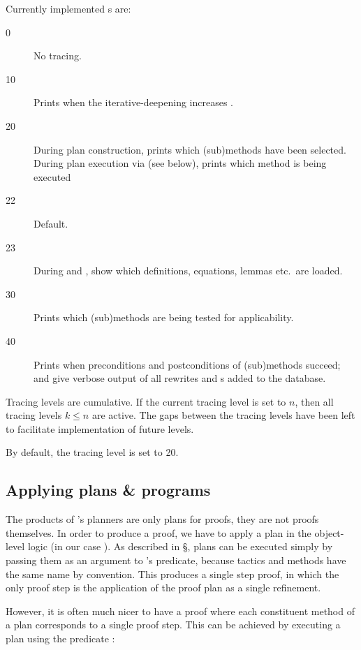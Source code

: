 Currently implemented s are:
\begin{description}
\item[0\ ] No tracing.
\item[10] Prints when the iterative-deepening increases .
\item[20] During plan construction, prints which (sub)methods have been
         selected. During plan execution via  (see
         below), prints which method is being executed
\item [22] Default.
\item [23] During  and , show which definitions,
equations, lemmas etc.\ are loaded.
\item[30] Prints which (sub)methods are being tested for applicability.
\item[40] Prints when preconditions and postconditions of (sub)methods
succeed;  and  give verbose output of all \inx
{rewrites} and
s added to the database.

\end{description}
Tracing levels are cumulative. If the current tracing level is set to
$n$, then all tracing levels $k \leq n$ are active. The gaps between
the tracing levels have been left to facilitate implementation of
future levels.

By default, the tracing level is set to 20.

\subsection {Applying plans \& programs}

The products of {\clam}'s planners are only plans for proofs, they are
not proofs themselves. In order to produce a proof, we have to apply a
plan in the object-level logic (in our case \oyster). As described in
\S{}, plans can be executed simply by passing them as
an argument to \oyster's  predicate, because tactics and
methods have the same name by convention. This produces a single step
proof, in which the only proof step is the application of the proof
plan as a single refinement.

However, it is often much nicer to have a proof where each constituent
method of a plan corresponds to a single proof step. This can be
achieved by executing a plan using the predicate :

